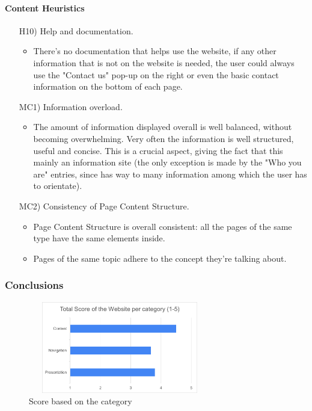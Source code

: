 \documentclass[11pt, letterpaper]{article}
\begin{document}
\paragraph{Content Heuristics}
    \begin{enumerate}
        \item[H10)] Help and documentation.
            \begin{itemize}
                \item There's no documentation that helps use the website, if any other information that is not on the website is needed, the user could always use the "Contact us" pop-up on the right or even the basic contact information on the bottom of each page.
            \end{itemize}
        \item[MC1)] Information overload.
            \begin{itemize}
                \item The amount of information displayed overall is well balanced, without becoming overwhelming. Very often the information is well structured, useful and concise. This is a crucial aspect, giving the fact that this mainly an information site (the only exception is made by the "Who you are" entries, since has way to many information among which the user has to orientate).
            \end{itemize}
        \item[MC2)] Consistency of Page Content Structure.
            \begin{itemize}
                \item Page Content Structure is overall consistent: all the pages of the same type have the same elements inside.
                \item Pages of the same topic adhere to the concept they're talking about. 
            \end{itemize}
    \end{enumerate}

\subsubsection{Conclusions}

\begin{figure}[H]
    \centering
    \includegraphics[width=8cm,height=4cm]{images/inspection/Conclusions/Category_score.png}
    \caption{Score based on the category}
    \label{fig:category_score}
\end{figure}
\end{document}
